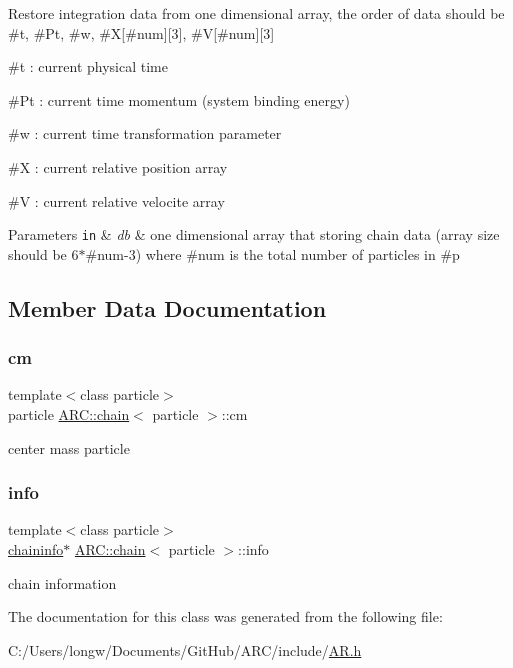 Restore integration data from one dimensional array, the order of data should be \#t, \#\+Pt, \#w, \#X\mbox{[}\#num\mbox{]}\mbox{[}3\mbox{]}, \#V\mbox{[}\#num\mbox{]}\mbox{[}3\mbox{]}
\begin{DoxyItemize}
\item \#t \+: current physical time
\item \#\+Pt \+: current time momentum (system binding energy)
\item \#w \+: current time transformation parameter
\item \#X \+: current relative position array
\item \#V \+: current relative velocite array 
\begin{DoxyParams}[1]{Parameters}
\mbox{\tt in}  & {\em db} & one dimensional array that storing chain data (array size should be 6$\ast$\#num-\/3) where \#num is the total number of particles in \#p \\
\hline
\end{DoxyParams}

\end{DoxyItemize}

\subsection{Member Data Documentation}
\hypertarget{classARC_1_1chain_ae9f6a5cbf7aac2b33c7274e7e10916ed}{}\label{classARC_1_1chain_ae9f6a5cbf7aac2b33c7274e7e10916ed} 
\subsubsection{\texorpdfstring{cm}{cm}}
{\footnotesize\ttfamily template$<$class particle$>$ \\
particle \hyperlink{classARC_1_1chain}{A\+R\+C\+::chain}$<$ particle $>$\+::cm}



center mass particle 

\hypertarget{classARC_1_1chain_add4ef2186b8ed203eeadc8c17c4c73ef}{}\label{classARC_1_1chain_add4ef2186b8ed203eeadc8c17c4c73ef} 
\subsubsection{\texorpdfstring{info}{info}}
{\footnotesize\ttfamily template$<$class particle$>$ \\
\hyperlink{classARC_1_1chaininfo}{chaininfo}$\ast$ \hyperlink{classARC_1_1chain}{A\+R\+C\+::chain}$<$ particle $>$\+::info}



chain information 



The documentation for this class was generated from the following file\+:\begin{DoxyCompactItemize}
\item 
C\+:/\+Users/longw/\+Documents/\+Git\+Hub/\+A\+R\+C/include/\hyperlink{AR_8h}{A\+R.\+h}\end{DoxyCompactItemize}

